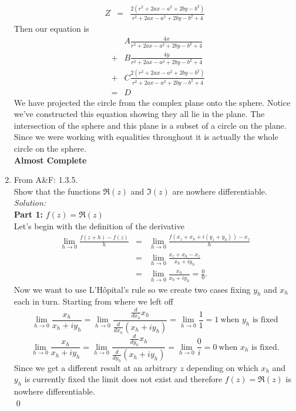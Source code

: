 \documentclass[10pt]{amsart}
\theoremstyle{nonumberplain}
\begin{document}
\begin{enumerate}[label={\bf {\arabic*}:}]
\begin{eqnarray*}
Z &=& \frac{2\left(r^2 +2ax - a^2 +2by - b^2\right)}{r^2 +2ax - a^2 +2by - b^2 + 4}
\end{eqnarray*}
Then our equation is
\begin{eqnarray*}
&& A\frac{4x}{r^2 +2ax - a^2 +2by - b^2 + 4}  \\
&+& B\frac{4y}{r^2 +2ax - a^2 +2by - b^2 + 4} \\
&+& C\frac{2\left(r^2 +2ax - a^2 +2by - b^2\right)}{r^2 +2ax - a^2 +2by - b^2 + 4} \\
&=& D
\end{eqnarray*}
We have projected the circle from the complex plane onto the sphere. Notice we've constructed this equation showing they all lie in the plane. The intersection of the sphere and this plane is a subset of a circle on the plane. Since we were working with equalities throughout it is actually the whole circle on the sphere. \\
\textbf{Almost Complete} \\

\item From A\&F: 1.3.5.\\
Show that the functions $\Re(z)$ and $\Im(z)$ are nowhere differentiable. \\
\textit{Solution:} \\
\textbf{Part 1:} $f(z) = \Re(z)$ \\
Let's begin with the definition of the derivative
\begin{eqnarray*}
\lim_{h \rightarrow 0} \frac{f(z + h) - f(z)}{h} &=& \lim_{h \rightarrow 0} \frac{f(x_z + x_h + i (y_z + y_h) ) - x_z}{h} \\
								 &=& \lim_{h \rightarrow 0} \frac{x_z + x_h - x_z}{x_h + iy_h} \\
								 &=& \lim_{h \rightarrow 0} \frac{x_h}{x_h + iy_h} = \frac{0}{0}.						
\end{eqnarray*}
Now we want to use L'Hôpital's rule so we create two cases fixing $y_h$ and $x_h$ each in turn.
Starting from where we left off
$$ \lim_{h \rightarrow 0} \frac{x_h}{x_h + iy_h} = \lim_{h \rightarrow 0} \frac{ \frac{d}{dx_h}x_h}{\frac{d}{dx_h}(x_h + iy_h)} = \lim_{h \rightarrow 0} \frac{1}{1} = 1 \: \text{when $y_h$ is fixed} $$
$$ \lim_{h \rightarrow 0} \frac{x_h}{x_h + iy_h} = \lim_{h \rightarrow 0} \frac{ \frac{d}{dy_h}x_h}{\frac{d}{dy_h}(x_h + iy_h)} = \lim_{h \rightarrow 0} \frac{0}{i} = 0 \: \text{when $x_h$ is fixed}. $$
Since we get a different result at an arbitrary $z$ depending on which $x_h$ and $y_h$ is currently fixed the limit does not exist and therefore $f(z) = \Re(z)$ is nowhere differentiable. \\
\qed


\end{enumerate}
\end{document}
